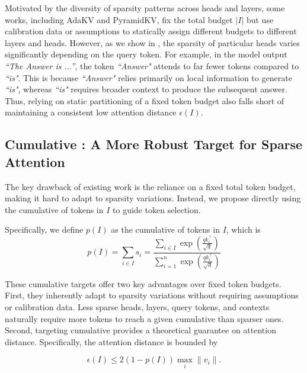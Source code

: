 Motivated by the diversity of sparsity patterns across heads and layers, some works, including AdaKV\cite{feng2024adakvoptimizingkvcache} and PyramidKV\cite{cai2024pyramidkvdynamickvcache}, fix the total budget $|I|$ but use calibration data or assumptions to statically assign different budgets to different layers and heads. However, as we show in , the sparsity of particular heads varies significantly depending on the query token. For example, in the model output \textit{``The Answer is ...''}, the token \textit{``Answer"} attends to far fewer tokens compared to \textit{``is"}. This is because \textit{``Answer"} relies primarily on local information to generate \textit{``is"}, whereas \textit{``is"} requires broader context to produce the subsequent answer. Thus, relying on static partitioning of a fixed token budget also falls short of maintaining a consistent low attention distance $\epsilon(I)$. 






\subsection{Cumulative \AS{}: A More Robust Target for Sparse Attention}
\label{subsec:analysis-cumulative-as}

The key drawback of existing work is the reliance on a fixed total token budget, making it hard to adapt to sparsity variations. Instead, we propose directly using the cumulative \as{} of tokens in $I$ to guide token selection.

Specifically, we define $p(I)$ as the cumulative \as{} of tokens in $I$, which is
\begin{equation}
    p(I)=\sum_{i\in I}s_i=\frac{\sum_{i\in I}\exp(\frac{qk_i^\top}{\sqrt{d}})}{\sum_{i=1}^{n}\exp(\frac{qk_i^\top}{\sqrt{d}})}
\end{equation}

These cumulative \as{} targets offer two key advantages over fixed token budgets. First, they inherently adapt to sparsity variations without requiring assumptions or calibration data. Less sparse heads, layers, query tokens, and contexts naturally require more tokens to reach a given cumulative \as{} than sparser ones. Second, targeting cumulative \as{} provides a theoretical guarantee on attention distance. Specifically, the attention distance is bounded by  

\begin{equation}
    \epsilon(I)\leq 2(1-p(I))\max_i\|v_i\|.
\end{equation}  

